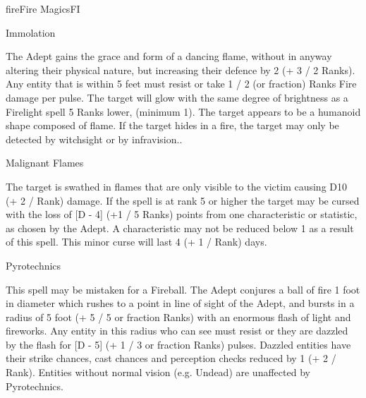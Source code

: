 \begin{College}[2.0]{fire}{Fire Magics}{FI}
\begin{spell}[S-7]{Immolation}

\begin{effects}
The Adept gains the grace and form of a dancing flame, without in
anyway altering their physical nature, but increasing their defence by
2 (+ 3 / 2 Ranks).  Any entity that is within 5 feet must resist or
take 1 / 2 (or fraction) Ranks Fire damage per pulse.  The target will
glow with the same degree of brightness as a Firelight spell 5 Ranks
lower, (minimum 1).  The target appears to be a humanoid shape
composed of flame.  If the target hides in a fire, the target may only
be detected by witchsight or by infravision..
\end{effects}
\end{spell}

\begin{spell}[S-8]{Malignant Flames}

\begin{effects}
The target is swathed in flames that are only visible to the victim
causing D10 (+ 2 / Rank) damage. If the spell is at rank 5 or higher
the target may be cursed with the loss of [D - 4] (+1 / 5 Ranks)
points from one characteristic or statistic, as chosen by the Adept.
A characteristic may not be reduced below 1 as a result of this spell.
This minor curse will last 4 (+ 1 / Rank) days.
\end{effects}
\end{spell}

\begin{spell}[S-9]{Pyrotechnics}

\begin{effects}
This spell may be mistaken for a Fireball.  The Adept conjures a ball
of fire 1 foot in diameter which rushes to a point in line of sight of
the Adept, and bursts in a radius of 5 foot (+ 5 / 5 or fraction
Ranks) with an enormous flash of light and fireworks.  Any entity in
this radius who can see must resist or they are dazzled by the flash
for [D - 5] (+ 1 / 3 or fraction Ranks) pulses. Dazzled entities have
their strike chances, cast chances and perception checks reduced by 1
(+ 2 / Rank). Entities without normal vision (e.g.  Undead) are
unaffected by Pyrotechnics.
\end{effects}
\end{spell}


\end{College}
